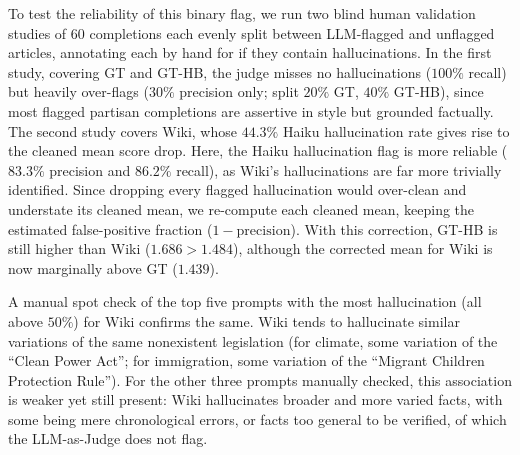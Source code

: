\documentclass[12pt]{article}
\begin{document}
To test the reliability of this binary flag, we run two blind human validation studies of 60 completions each evenly split between LLM-flagged and unflagged articles, annotating each by hand for if they contain hallucinations.
In the first study, covering GT and GT-HB, the judge misses no hallucinations ($100\%$ recall) but heavily over-flags ($30\%$ precision only; split $20\%$ GT, $40\%$ GT-HB), since most flagged partisan completions are assertive in style but grounded factually.  
The second study covers Wiki, whose $44.3\%$ Haiku hallucination rate gives rise to the cleaned mean score drop. 
Here, the Haiku hallucination flag is more reliable ($83.3\%$ precision and $86.2\%$ recall), as Wiki's hallucinations are far more trivially identified. 
Since dropping every flagged hallucination would over-clean and understate its cleaned mean, we re-compute each cleaned mean, keeping the estimated false-positive fraction ($1-\mathrm{precision}$). 
With this correction, GT-HB is still higher than Wiki ($1.686 > 1.484$), although the corrected mean for Wiki is now marginally above GT ($1.439$). 

A manual spot check of the top five prompts with the most hallucination (all above $50\%$) for Wiki confirms the same.
Wiki tends to hallucinate similar variations of the same nonexistent legislation (for climate, some variation of the ``Clean Power Act''; for immigration, some variation of the ``Migrant Children Protection Rule'').
For the other three prompts manually checked, this association is weaker yet still present: Wiki hallucinates broader and more varied facts, with some being mere chronological errors, or facts too general to be verified, of which the LLM-as-Judge does not flag.
\end{document}
